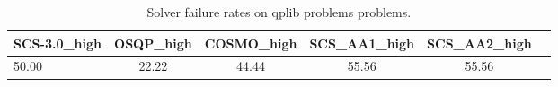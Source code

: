 \begin{table}
\centering
\caption{Solver failure rates on qplib problems problems.}
\label{t-qplib problems-failure}
\begin{tabular}{lccccc}
\toprule
 SCS-3.0\_high &  OSQP\_high &  COSMO\_high &  SCS\_AA1\_high &  SCS\_AA2\_high \\
\midrule
        50.00 &      22.22 &       44.44 &         55.56 &         55.56 \\
\bottomrule
\end{tabular}
\end{table}
